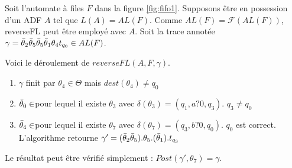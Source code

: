Soit l'automate à files $F$ dans la figure \ref{fig:fifo1}. Supposons être en possession d'un ADF $A$ tel que $L(A)=AL(F)$.
Comme $AL(F)=\mathcal{F}(AL(F))$, reverseFL peut être employé avec $A$.
Soit la trace annotée $\gamma=\bar{\theta}_2\bar{\theta}_5\bar{\theta}_5\bar{\theta}_1\theta_4 t_{q_0} \in AL(F)$.

Voici le déroulement de $reverseFL(A,F,\gamma)$.

\begin{enumerate}
  \item $\gamma$ finit par $\theta_4\in\Theta$ mais $dest(\theta_4)\neq q_0$
  \item $\bar{\theta}_0\in$\barTheta pour lequel il existe $\theta_3$ avec $\delta(\theta_3)=(q_1,a?0,q_3)$. $q_3\neq q_0$
  \item $\bar{\theta}_4\in$\barTheta pour lequel il existe $\theta_7$ avec $\delta(\theta_7)=(q_3,b?0,q_0)$. $q_0$ est correct. L'algorithme retourne $\gamma'=(\bar{\theta}_2\bar{\theta}_5).\theta_5.(\bar{\theta}_1).t_{q_3}$
\end{enumerate}

Le résultat peut être vérifié simplement : $Post(\gamma',\theta_7)=\gamma$.
